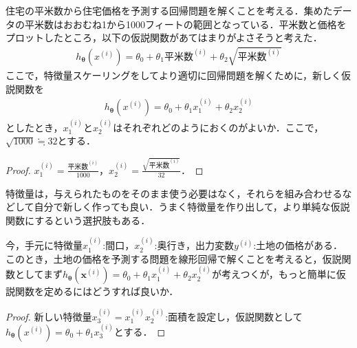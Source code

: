 \begin{qu}
住宅の平米数から住宅価格を予測する回帰問題を解くことを考える．集めたデータの平米数はおおむね1から1000フィートの範囲となっている．平米数と価格をプロットしたところ，以下の仮説関数があてはまりがよさそうと考えた．
\begin{align*}
h_{{\bm \theta}}(x^{(i)})=\theta_0+\theta_1 平米数^{(i)}+\theta_2 \sqrt{平米数^{(i)}}
\end{align*}
ここで，特徴量スケーリングをしてより適切に回帰問題を解くために，新しく仮説関数を
\begin{align*}
h_{{\bm \theta}}(x^{(i)})=\theta_0+\theta_1 x_1^{(i)}+\theta_2 x_2^{(i)}
\end{align*}
としたとき，$x_1^{(i)}$と$x_2^{(i)}$はそれぞれどのようにおくのがよいか．ここで，$\sqrt{1000}\fallingdotseq 32$とする．
\end{qu}
\begin{proof}
$x_1^{(i)}=\frac{平米数^{(i)}}{1000}$，$x_2^{(i)}=\frac{\sqrt{平米数^{(i)}}}{32}$．
\end{proof}

特徴量は，与えられたものをそのまま使う必要はなく，それらを組み合わせるなどして自分で新しく作っても良い．うまく特徴量を作り出して，より単純な仮説関数にするという選択肢もある．

\begin{qu}
今，手元に特徴量$x_1^{(i)}$:間口，$x_2^{(i)}$:奥行き，出力変数$y^{(i)}$:土地の価格がある．このとき，土地の価格を予測する問題を線形回帰で解くことを考えると，仮説関数としてまず$h_{{\bm \theta}}({\bm x}^{(i)})=\theta_0+\theta_1 x_1^{(i)}+\theta_2 x_2^{(i)}$が考えつくが，もっと簡単に仮説関数を定めるにはどうすれば良いか．
\end{qu}
\begin{proof}
新しい特徴量$x_3^{(i)}=x_1^{(i)}x_2^{(i)}$:面積を設定し，仮説関数として$h_{{\bm \theta}}(x^{(i)})=\theta_0+\theta_1 x_3^{(i)}$とする．
\end{proof}
